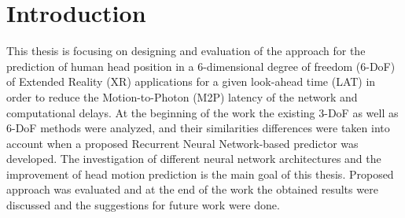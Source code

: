 \chapter{Introduction}
\label{sec:intro}
This thesis is focusing on designing and evaluation of the approach for the prediction of human head position in a 6-dimensional degree of freedom (6-DoF) of Extended Reality (XR) applications for a given look-ahead time (LAT) in order to reduce the Motion-to-Photon (M2P) latency of the network and computational delays. At the beginning of the work the existing 3-DoF as well as 6-DoF methods were analyzed, and their similarities differences were taken into account when a proposed Recurrent Neural Network-based predictor was developed. The investigation of different neural network architectures and the improvement of head motion prediction is the main goal of this thesis. Proposed approach was evaluated and at the end of the work the obtained results were discussed and the suggestions for future work were done.

